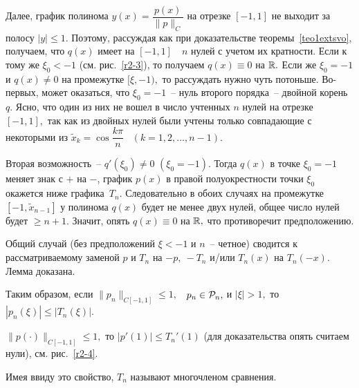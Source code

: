\noindent

{Далее, график полинома $y{(x)}=\dfrac{p(x)}{\|p\|_{C}}$ на отрезке
$[-1,1]$ не выходит за полосу $|y| \le 1.$ Поэтому, рассуждая как при
доказательстве теоремы~\ref{teo1extsvo}, получаем, что $q(x)$ имеет на
$[-1,1]\quad n$ нулей с учетом их кратности. Если к тому же $\xi_0 < -1$
{(см. рис.~\ref{r2-3})}, то получаем $q(x) \equiv 0$ на $\mathbb{R}.$
Если же $\xi_0=-1$ и $q(x) \ne 0$ на промежутке $[\xi, -1),$ то рассуждать
нужно чуть потоньше. Во-первых, может оказаться, что $\xi_0=-1$~-- нуль
второго порядка~-- двойной корень $q.$ Ясно, что один из них не вошел в
число учтенных $n$ нулей на отрезке $[-1,1],$ так как из двойных нулей
были учтены только совпадающие с некоторыми из $\widetilde x_k=\cos
\dfrac{k\pi}{n}$~ $(k=1,2,\ldots,n-1).$}

{Вторая возможность~-- $q'(\xi_0) \ne 0$ {$(\xi_0=-1)$.}
Тогда $q(x)$ в
точке $\xi_0=-1$ меняет знак с $+$ на $-$, график $p(x)$ в
правой полуокрестности точки {$\xi_0$} окажется ниже
графика~$T_n.$ Следовательно в обоих случаях {на промежутке $[-1,\widetilde{x}_{n-1}]$}
{у полинома $q(x)$ будет не менее двух нулей,} общее число
нулей будет $\ge n+1.$ Значит, опять $q(x) \equiv 0$ на $\mathbb{R},$
что противоречит предположению.}

{Общий случай (без предположений $\xi < -1$ и $n$~-- четное) сводится к
рассматриваемому заменой $p$ и $T_n$ на $-p,\ -T_n$ и/или $T_n(x)$ на $T_n(-x)$. Лемма
доказана.}



{Таким образом, если $\|p_n\|_{C[-1,1]} \le 1,$~ $p_n \in \mathcal{P}_n,$ и
$|\xi|>1,$ то $|p_n(\xi)| \le |T_n(\xi)|.$}

$\|p(\cdot )\|_{C[-1,1]} \le 1,$ то $|p'(1)| \le T_n'(1)$ (для доказательства
опять считаем нули), {см. рис.~\ref{r2-4}}.

{Имея ввиду это свойство, $T_n$} называют многочленом сравнения.




